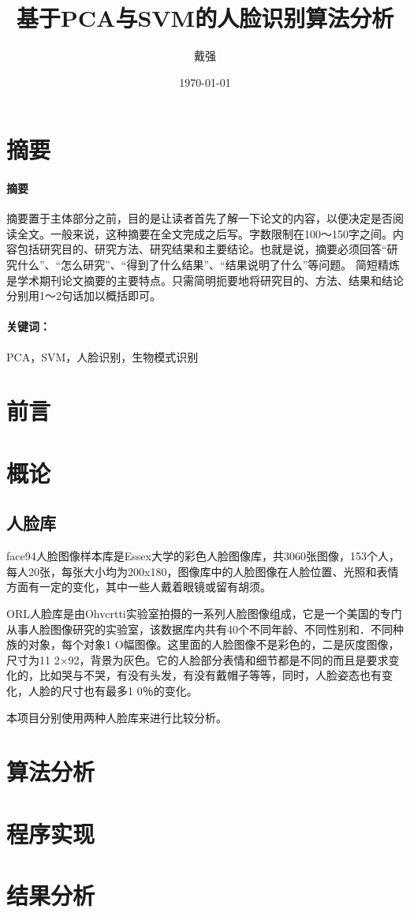 \documentclass{ctexart}
\title{基于PCA与SVM的人脸识别算法分析}
\author{戴强}
\date{\today}
\renewenvironment*{abstract}[1]{%
\newcommand\gjc{#1}
\paragraph{摘要}
}{\paragraph{关键词：}\gjc }
\begin{document}
\maketitle

\section{摘要}
\label{sec:zhaiyao}

\begin{abstract}{PCA，SVM，人脸识别，生物模式识别}
摘要置于主体部分之前，目的是让读者首先了解一下论文的内容，以便决定是否阅读全文。一般来说，这种摘要在全文完成之后写。字数限制在100～150字之间。内容包括研究目的、研究方法、研究结果和主要结论。也就是说，摘要必须回答“研究什么”、“怎么研究”、“得到了什么结果”、“结果说明了什么”等问题。
简短精炼是学术期刊论文摘要的主要特点。只需简明扼要地将研究目的、方法、结果和结论分别用1～2句话加以概括即可。
\end{abstract}


\newpage

\tableofcontents


\section{前言}
\label{sec:qianyan}


\section{概论}



\subsection{人脸库}

face94人脸图像样本库是Essex大学的彩色人脸图像库，共3060张图像，153个人，每人20张，每张大小均为200x180，图像库中的人脸图像在人脸位置、光照和表情方面有一定的变化，其中一些人戴着眼镜或留有胡须。

ORL人脸库是由Ohvcrtti实验室拍摄的一系列人脸图像组成，它是一个美国的专门从事人脸图像研究的实验室，该数据库内共有40个不同年龄、不同性别和．不同种族的对象，每个对象1 O幅图像。这里面的人脸图像不是彩色的，二是灰度图像，尺寸为11 2×92，背景为灰色。它的人脸部分表情和细节都是不同的而且是要求变化的，比如哭与不哭，有没有头发，有没有戴帽子等等，同时，人脸姿态也有变化，人脸的尺寸也有最多1 0％的变化。

本项目分别使用两种人脸库来进行比较分析。

\section{算法分析}

\section{程序实现}
\label{sec:shixian}

\section{结果分析}
\label{sec:jieguofenxi}
\end{document}
